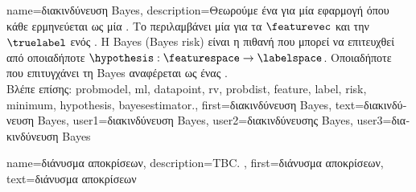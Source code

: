 {name={\foreignlanguage{greek}{διακινδύνευση} Bayes},
	description={\foreignlanguage{greek}{Θεωρούμε ένα}  \foreignlanguage{greek}{για μία εφαρμογή}  
		\foreignlanguage{greek}{όπου κάθε}  \foreignlanguage{greek}{ερμηνεύεται ως μία} .
		\foreignlanguage{greek}{Το}  \foreignlanguage{greek}{περιλαμβάνει μία}  
		\foreignlanguage{greek}{για τα}  $\featurevec$ \foreignlanguage{greek}{και την}  $\truelabel$ 
		\foreignlanguage{greek}{ενός} . 
		\foreignlanguage{greek}{Η}  Bayes (Bayes risk) 
		\foreignlanguage{greek}{είναι η}  \foreignlanguage{greek}{πιθανή}  \foreignlanguage{greek}{που 
		μπορεί να επιτευχθεί από οποιαδήποτε}  $\hypothesis: \featurespace \rightarrow \labelspace$. 
		\foreignlanguage{greek}{Οποιαδήποτε}  \foreignlanguage{greek}{που επιτυγχάνει τη}  
		Bayes \foreignlanguage{greek}{αναφέρεται ως ένας}  \cite{LC}.
		\\
		\foreignlanguage{greek}{Βλέπε επίσης:} \gls{probmodel}, \gls{ml}, \gls{datapoint}, \gls{rv}, \gls{probdist}, \gls{feature}, \gls{label},  \gls{risk}, 
		\gls{minimum}, \gls{hypothesis}, \gls{bayesestimator}.},
	first={\foreignlanguage{greek}{διακινδύνευση} Bayes},
	text={\foreignlanguage{greek}{διακινδύνευση} Bayes},
	user1={\foreignlanguage{greek}{διακινδύνευση} Bayes}, %
	user2={\foreignlanguage{greek}{διακινδύνευσης} Bayes}, %
	user3={\foreignlanguage{greek}{διακινδύνευση} Bayes} %
}

{name={\foreignlanguage{greek}{διάνυσμα αποκρίσεων}},
	description={TBC. },  
 	first={\foreignlanguage{greek}{διάνυσμα αποκρίσεων}}, 
 	text={\foreignlanguage{greek}{διάνυσμα αποκρίσεων}}
}%

